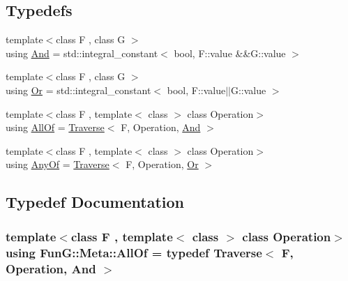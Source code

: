 \subsection*{Typedefs}
\begin{DoxyCompactItemize}
\item 
{\footnotesize template$<$class F , class G $>$ }\\using \hyperlink{namespaceFunG_1_1Meta_a6f0fce21e31ab8fdc307eddead3b8d66}{And} = std\+::integral\+\_\+constant$<$ bool, F\+::value \&\&G\+::value $>$
\item 
{\footnotesize template$<$class F , class G $>$ }\\using \hyperlink{namespaceFunG_1_1Meta_a54cebc5541fa7677e239a9b7a84aba7e}{Or} = std\+::integral\+\_\+constant$<$ bool, F\+::value$\vert$$\vert$G\+::value $>$
\item 
{\footnotesize template$<$class F , template$<$ class $>$ class Operation$>$ }\\using \hyperlink{namespaceFunG_1_1Meta_aa62ce805a20b342ffc1947c210be3501}{All\+Of} = \hyperlink{structFunG_1_1Meta_1_1Traverse}{Traverse}$<$ F, Operation, \hyperlink{namespaceFunG_1_1Meta_a6f0fce21e31ab8fdc307eddead3b8d66}{And} $>$
\item 
{\footnotesize template$<$class F , template$<$ class $>$ class Operation$>$ }\\using \hyperlink{namespaceFunG_1_1Meta_a54a94493bb1caa42606dd7e6744abf8c}{Any\+Of} = \hyperlink{structFunG_1_1Meta_1_1Traverse}{Traverse}$<$ F, Operation, \hyperlink{namespaceFunG_1_1Meta_a54cebc5541fa7677e239a9b7a84aba7e}{Or} $>$
\end{DoxyCompactItemize}


\subsection{Typedef Documentation}
\subsubsection[{\texorpdfstring{All\+Of}{AllOf}}]{\setlength{\rightskip}{0pt plus 5cm}template$<$class F , template$<$ class $>$ class Operation$>$ using {\bf Fun\+G\+::\+Meta\+::\+All\+Of} = typedef {\bf Traverse}$<$ F, Operation, {\bf And} $>$}\hypertarget{namespaceFunG_1_1Meta_aa62ce805a20b342ffc1947c210be3501}{}\label{namespaceFunG_1_1Meta_aa62ce805a20b342ffc1947c210be3501}
